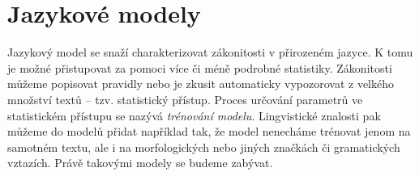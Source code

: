 \documentclass[12pt,a4paper]{report}
\newcommand{\argmax}[1]{\underset{#1}{\operatorname{arg}\,\operatorname{max}}\;}
\begin{document}









\chapter{Jazykové modely}
Jazykový model se snaží charakterizovat zákonitosti v přirozeném jazyce. K tomu je možné přistupovat za pomoci více či méně podrobné statistiky. Zákonitosti můžeme popisovat pravidly nebo je zkusit automaticky vypozorovat z velkého množství textů -- tzv. statistický přístup. Proces určování parametrů ve statistickém přístupu se nazývá \textit{trénování modelu}. Lingvistické znalosti pak můžeme do modelů přidat například tak, že model nenecháme trénovat jenom na samotném textu, ale i na morfologických nebo jiných značkách či gramatických vztazích. Právě takovými modely se budeme zabývat.

%
\end{document}

